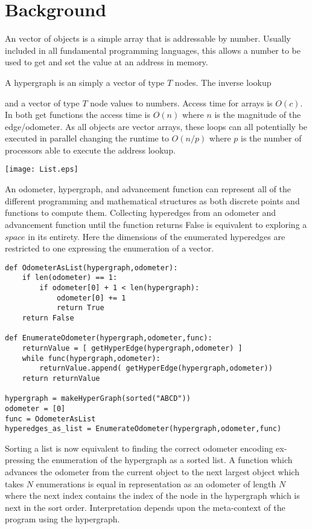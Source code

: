 
\section{Background}
An vector of objects is a simple array that is addressable by number. Usually included in all fundamental programming languages, this allows a number to be used to get and set the value at an address in memory. 



A hypergraph is an simply a vector of type $T$ nodes.  The inverse lookup  

and a vector of type $T$ node values to numbers. Access time for arrays is $O(c)$. In both get functions the access time is $O(n)$ where $n$ is the magnitude of the edge/odometer. As all objects are vector arrays, these loops can all potentially be executed in parallel changing the runtime to $O(n/p)$ where $p$ is the number of processors able to execute the address lookup.

\texttt{[image: List.eps]}


An odometer, hypergraph, and advancement function can represent all of the different programming and mathematical structures as both discrete points and functions to compute them. Collecting hyperedges from an odometer and advancement function until the function returns False is equivalent to exploring a $space$ in its entirety. Here the dimensions of the enumerated hyperedges are restricted to one expressing the enumeration of a vector.

\begin{lstlisting}
def OdometerAsList(hypergraph,odometer):
    if len(odometer) == 1:
        if odometer[0] + 1 < len(hypergraph):
            odometer[0] += 1
            return True
    return False

def EnumerateOdometer(hypergraph,odometer,func):
    returnValue = [ getHyperEdge(hypergraph,odometer) ]
    while func(hypergraph,odometer):
        returnValue.append( getHyperEdge(hypergraph,odometer))
    return returnValue

hypergraph = makeHyperGraph(sorted("ABCD"))
odometer = [0]
func = OdometerAsList
hyperedges_as_list = EnumerateOdometer(hypergraph,odometer,func)
\end{lstlisting}

Sorting a list is now equivalent to finding the correct odometer encoding ex- pressing the enumeration of the hypergraph as a sorted list. A function which advances the odometer from the current object to the next largest object which takes $N$ enumerations is equal in representation as an odometer of length $N$ where the next index contains the index of the node in the hypergraph which is next in the sort order. Interpretation depends upon the meta-context of the program using the hypergraph.
\newpage

